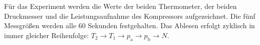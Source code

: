 Für das Experiment werden die Werte der beiden Thermometer, der beiden Druckmesser und die Leistungsaufnahme des Kompressors aufgezeichnet.
Die fünf Messgrößen werden alle 60 Sekunden festgehalten. Das Ablesen erfolgt zyklisch in immer gleicher Reihenfolge: 
$T_2 → T_1 → p_{\text{a}} → p_{\text{b}} → N.$

\newpage